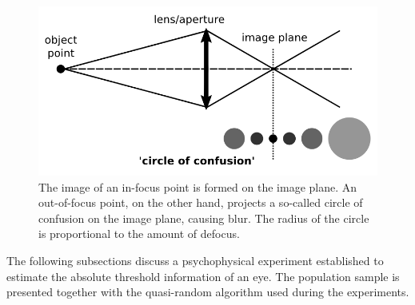 \begin{figure}[h]
	\centering
	\includegraphics[width=0.6\linewidth]{__Images/04/mv_insight.png}
	\caption[Geometrical perspective of the circle of confusion]{The image of an in-focus point is formed on the image plane. An out-of-focus point, on the other hand, projects a so-called circle of confusion on the image plane, causing blur. The radius of the circle is proportional to the amount of defocus.} 
	\label{fig:coc}
\end{figure}

The following subsections discuss a psychophysical experiment established to estimate the absolute threshold information of an eye. The population sample is presented together with the quasi-random algorithm used during the experiments. 
